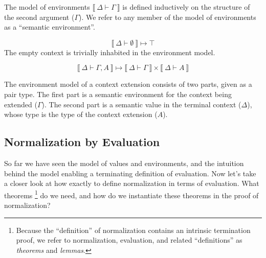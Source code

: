 \documentclass{llncs}
\newenvironment{mydefinition}[3]
{ \begin{mydefinition'}[#1] \label{def:#2}
  \hfill\break
  #3
}
{ \end{mydefinition'} }
\def\cross{\times}
\def\dfn{\mapsto}
\def\emp{\emptyset}
\newcommand{\els}[1]{\llbracket ~ #1 ~ \rrbracket}
\newcommand{\dtypm}[1]{\els{\Delta \vdash #1}}
\def\menv{\dmenv{\Gamma}}
\newcommand{\dmenv}[1]{\els{\Delta \vdash #1}}
\begin{document}
\begin{mydefinition}{Semantic Environments}{menv}
{
The model of environments $\menv$ is defined inductively on the structure
of the second argument ($\Gamma$). We refer to any member of the model
of environments as a ``semantic environment''.
}

\begin{mycase}
$$
\dmenv{\emp} \dfn \top
$$
The empty context is trivially inhabited in the environment model.
\end{mycase}

\begin{mycase}
$$
\dmenv{\Gamma, A} \dfn \dmenv{\Gamma} \cross \dtypm{A}
$$

The environment model of a context extension consists of two parts,
given as a pair type. The first part
is a semantic environment for the context being extended ($\Gamma$). The second part
is a semantic value in the terminal context ($\Delta$),
whose type is the type of the context extension ($A$).

\end{mycase}

\end{mydefinition}

\subsection{Normalization by Evaluation}

So far we have seen the model of values and environments, and the
intuition behind the model enabling a terminating definition of evaluation.
Now let's take a closer look at how exactly to define normalization in
terms of evaluation. What theorems 
\footnote{Because the ``definition'' of normalization contains an
intrinsic termination proof, we refer to normalization, evaluation, and
related ``definitions'' as \textit{theorems} and \textit{lemmas}.}
do we need, and how do we instantiate these theorems in the proof of
normalization?
\end{document}
